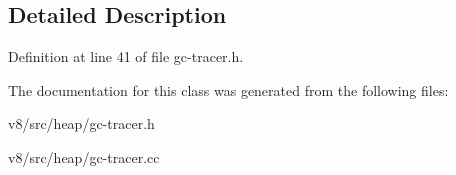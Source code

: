 \subsection{Detailed Description}


Definition at line 41 of file gc-\/tracer.\+h.



The documentation for this class was generated from the following files\+:\begin{DoxyCompactItemize}
\item 
v8/src/heap/gc-\/tracer.\+h\item 
v8/src/heap/gc-\/tracer.\+cc\end{DoxyCompactItemize}
